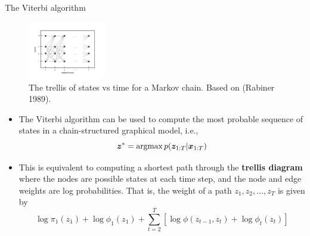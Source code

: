\documentclass[10pt,mathserif]{beamer}
\begin{document}
\begin{frame}{The Viterbi algorithm}
\begin{figure}[h]
\centering
\includegraphics[width=0.3\textwidth]{markovTrellis}
\caption{The trellis of states vs time for a Markov chain. Based on (Rabiner 1989).}
\end{figure}

\begin{itemize}\footnotesize
    \item  The Viterbi algorithm can be used to compute the most probable sequence of states in a chain-structured graphical model, i.e.,
    \begin{equation*}
        \bm{z}^* = \mathop{\rm argmax} p(\bm{z}_{1:T} |\bm{x}_{1:T} )
    \end{equation*}
    
    \item  This is equivalent to computing a shortest path through the \textbf{trellis diagram} where the nodes are possible states at each time step, and the node and edge weights are log probabilities. That is, the weight of a path $z_1,z_2,...,z_T$ is given by
    \begin{equation*}
        \log \pi_1(z_1) + \log \phi_1(z_1) +  \sum_{t=2}^T [\log \phi(z_{t-1}, z_t ) + \log \phi_t (z_t )]
    \end{equation*}
\end{itemize}
\end{frame}
\end{document}

